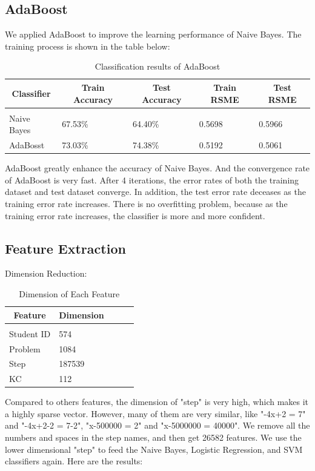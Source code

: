\documentclass{article} %
\begin{document}
\subsection{AdaBoost}
We applied AdaBoost to improve the learning  performance of Naive Bayes. The training process is shown in the table below:

\begin{table}[h]
\caption{Classification results of AdaBoost}
\label{sample-table}
\begin{center}
\begin{tabular}{lllll}
\multicolumn{1}{c}{\bf Classifier}  &\multicolumn{1}{c}{\bf Train Accuracy} &\multicolumn{1}{c}{\bf Test Accuracy} &\multicolumn{1}{c}{\bf Train RSME} &\multicolumn{1}{c}{\bf Test RSME}
\\ \hline \\
Naive Bayes		&67.53\%   &64.40\%   &0.5698   &0.5966\\
AdaBosst	&73.03\%   &74.38\%   &0.5192   &0.5061\\
\end{tabular}
\end{center}
\end{table}

AdaBoost greatly enhance the accuracy of Naive Bayes.  And the convergence rate of AdaBoost is very fast. After 4 iterations, the error rates of both the training dataset and test dataset converge. In addition, the test error rate deceases as the training error rate increases. There is no overfitting problem, because as the training error rate increases, the classifier is more and more confident.

\subsection{Feature Extraction}
Dimension Reduction:
\begin{table}[h]
\caption{Dimension of Each Feature}
\label{sample-table}
\begin{center}
\begin{tabular}{lllll}
\multicolumn{1}{c}{\bf Feature}  &\multicolumn{1}{c}{\bf Dimension} 
\\ \hline \\
Student ID		&574\\
Problem			&1084\\
Step				&187539\\
KC				&112\\
\end{tabular}
\end{center}
\end{table}
Compared to others features, the dimension of "step" is very high, which makes it a highly sparse vector. However, many of them are very similar, like "-4x+2 = 7" and "-4x+2-2 = 7-2", "x-500000 = 2" and "x-5000000 = 40000". We remove all the numbers and spaces in the step names, and then get 26582 features. We use the lower dimensional "step" to feed the Naive Bayes, Logistic Regression, and SVM classifiers again. Here are the results:
\end{document}
